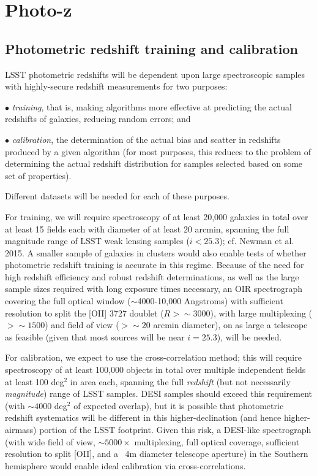 
\section{Photo-z}
\label{sec:photoz}

\subsection{Photometric redshift training and calibration}\label{subsec:training}

LSST photometric redshifts will be dependent upon large spectroscopic samples with highly-secure redshift measurements for two purposes: 

$\bullet$ {\it training}, that is, making algorithms more effective at predicting the actual redshifts of galaxies, reducing random errors; and 

$\bullet$ {\it calibration}, the determination of the actual bias and scatter in redshifts produced by a given algorithm (for most purposes, this reduces to the problem of determining the actual redshift distribution for samples selected based on some set of properties).  

Different datasets will be needed for each of these purposes.

For training, we will require spectroscopy of at least 20,000 galaxies in total over at least 15 fields each with diameter of at least 20 arcmin, spanning the full magnitude range of LSST weak lensing samples ($i<25.3$); cf. Newman et al. 2015.  A smaller sample of galaxies in clusters would also enable tests of whether photometric redshift training is accurate in this regime.  Because of the need for high redshift efficiency and robust redshift determinations, as well as the large sample sizes required with long exposure times necessary, an OIR spectrograph covering the full optical window ($\sim$4000-10,000 Angstroms) with sufficient resolution to split the [OII] 3727 doublet ($R\gt\sim 3000$), with large multiplexing ($>\sim 1500$) and field of view ($>\sim 20$ arcmin diameter), on as large a telescope as feasible (given that most sources will be near $i=25.3$), will be needed.  

For calibration, we expect to use the cross-correlation method; this will require spectroscopy of at least 100,000 objects in total over multiple independent fields at least 100 deg$^2$ in area each, spanning the full {\em redshift} (but not necessarily {\em magnitude}) range of LSST samples.  DESI samples should exceed this requirement (with $\sim 4000$ deg$^2$ of expected overlap), but it is possible that photometric redshift systematics will be different in this higher-declination (and hence higher-airmass) portion of the LSST footprint.   Given this risk, a DESI-like spectrograph (with wide field of view, $\sim 5000\times$ multiplexing, full optical coverage, sufficient resolution to split [OII], and a ~4m diameter telescope aperture) in the Southern hemisphere would enable ideal calibration via cross-correlations.  

